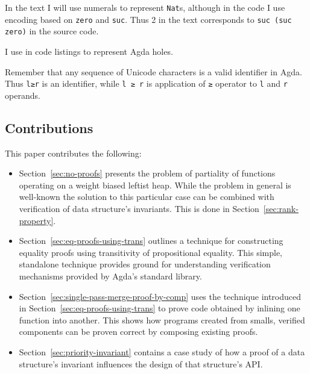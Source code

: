 In the text I will use numerals to represent \texttt{Nat}s, although in the code I use encoding based on \texttt{zero} and \texttt{suc}. Thus 2 in the text corresponds to \texttt{suc (suc zero)} in the source code.

I use \texttt{} in code listings to represent Agda holes.

Remember that any sequence of Unicode characters is a valid identifier in Agda. Thus \texttt{l≥r} is an identifier, while \texttt{l ≥ r} is application of \texttt{≥} operator to \texttt{l} and \texttt{r} operands.

\subsection{Contributions}

This paper contributes the following:

\begin{itemize}
 \item Section~\ref{sec:no-proofs} presents the problem of partiality of functions operating on a weight biased leftist heap. While the problem in general is well-known the solution to this particular case can be combined with verification of data structure's invariants. This is done in Section~\ref{sec:rank-property}.
 \item Section~\ref{sec:eq-proofs-using-trans} outlines a technique for constructing equality proofs using transitivity of propositional equality. This simple, standalone technique provides ground for understanding verification mechanisms provided by Agda's standard library.
 \item Section~\ref{sec:single-pass-merge-proof-by-comp} uses the technique introduced in Section~\ref{sec:eq-proofs-using-trans} to prove code obtained by inlining one function into another. This shows how programs created from smalls, verified components can be proven correct by composing existing proofs.
 \item Section~\ref{sec:priority-invariant} contains a case study of how a proof of a data structure's invariant influences the design of that structure's API.
\end{itemize}

